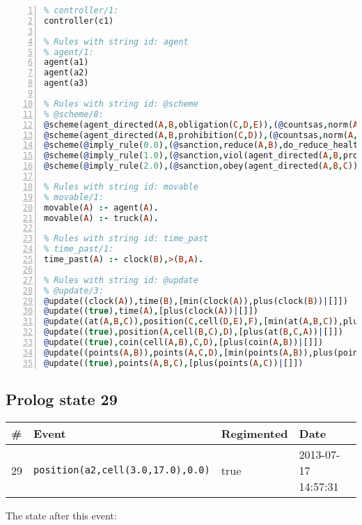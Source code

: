 \documentclass[11pt]{article}\usepackage[utf8]{inputenc}\usepackage{geometry}
\begin{document}
\begin{lstlisting}[language=Prolog, numbers=left]
% Rules with string id: controller
% controller/1:
controller(c1)

% Rules with string id: agent
% agent/1:
agent(a1)
agent(a2)
agent(a3)

% Rules with string id: @scheme
% @scheme/8:
@scheme(agent_directed(A,B,obligation(C,D,E)),(@countsas,norm(A,B,F,obligation(C,D,E)),F),false,(listTrue(C)),(time_past(D)),false,[plus(viol(agent_directed(A,B,obligation(C,D,E))))|[]],[plus(obey(agent_directed(A,B,obligation(C,D,E))))|[]])
@scheme(agent_directed(A,B,prohibition(C,D)),(@countsas,norm(A,B,E,prohibition(C,D)),E),(listTrue(C)),false,(false),false,[plus(viol(agent_directed(A,B,prohibition(C,D))))|[]],[plus(obey(agent_directed(A,B,prohibition(C,D))))|[]])
@scheme(@imply_rule(0.0),(@sanction,reduce(A,B),do_reduce_health(A,B),notifyAgent(A,changed(status))),true,false,false,false,[min(reduce(A,B))|[]],[])
@scheme(@imply_rule(1.0),(@sanction,viol(agent_directed(A,B,prohibition(C,D))),do_sanction(D)),true,false,false,false,[min(viol(agent_directed(A,B,prohibition(C,D))))|[]],[])
@scheme(@imply_rule(2.0),(@sanction,obey(agent_directed(A,B,C))),true,false,false,false,[min(obey(agent_directed(A,B,C)))|[]],[])

% Rules with string id: movable
% movable/1:
movable(A) :- agent(A).
movable(A) :- truck(A).

% Rules with string id: time_past
% time_past/1:
time_past(A) :- clock(B),>(B,A).

% Rules with string id: @update
% @update/3:
@update((clock(A)),time(B),[min(clock(A)),plus(clock(B))|[]])
@update((true),time(A),[plus(clock(A))|[]])
@update((at(A,B,C)),position(C,cell(D,E),F),[min(at(A,B,C)),plus(at(D,E,C))|[]])
@update((true),position(A,cell(B,C),D),[plus(at(B,C,A))|[]])
@update((true),coin(cell(A,B),C,D),[plus(coin(A,B))|[]])
@update((points(A,B)),points(A,C,D),[min(points(A,B)),plus(points(A,D))|[]])
@update((true),points(A,B,C),[plus(points(A,C))|[]])

\end{lstlisting}
\clearpage 
\subsection{Prolog state 29}
\begin{table}[ht]
\centering 
\begin{tabular}{l l l l} 
\textbf{\#} & \textbf{Event} & \textbf{Regimented} & \textbf{Date} \\ [0.5ex] 
\hline
29&\texttt{position(a2,cell(3.0,17.0),0.0)}&true&2013-07-17 14:57:31\\ [1ex] \hline\end{tabular}
\end{table}
The state after this event:
\end{document}
